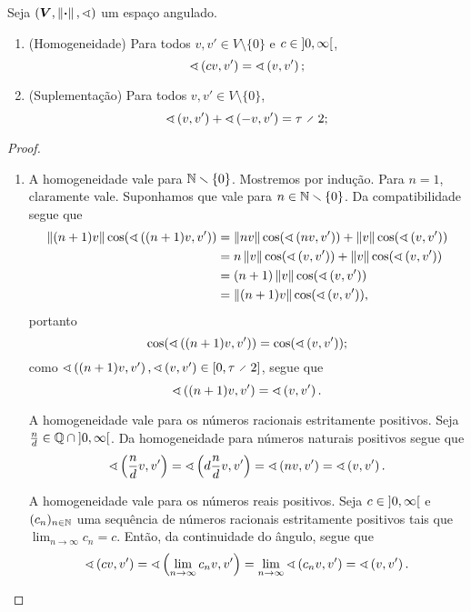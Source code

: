 \begin{proposition}
Seja $(\bm V, \left\Vert{\bm{\cdot}}\right\Vert,\sphericalangle)$ um espaço angulado.
	\begin{enumerate}
		\item (Homogeneidade) Para todos $v,v' \in V \setminus \{0\}$ e $c \in \left]{0},{\infty}\right[$,
			\begin{equation*}
				\sphericalangle\left({cv},{v'}\right) = \sphericalangle\left({v},{v'}\right);
			\end{equation*}
		\item (Suplementação) Para todos $v,v' \in V \setminus \{0\}$,
			\begin{equation*}
				\ang{v}{v'} + \ang{-v}{v'} = \tau \div 2;
			\end{equation*}
	\end{enumerate}
\end{proposition}
\begin{proof}
	\begin{enumerate}
		\item A homogeneidade vale para $\mathbb{N} \smallsetminus \{0\}$. Mostremos por indução. Para $n=1$, claramente vale. Suponhamos que vale para $n \in \mathbb{N} \smallsetminus \{0\}$. Da compatibilidade segue que
			\begin{align*}
				\left\Vert{(n+1)v}\right\Vert\cos(\sphericalangle\left({(n+1)v},{v'}\right)) &= \left\Vert{nv}\right\Vert\cos(\sphericalangle\left({nv},{v'}\right)) + \left\Vert{v}\right\Vert\cos(\sphericalangle\left({v},{v'}\right)) \\	
					&=n\left\Vert{v}\right\Vert\cos(\sphericalangle\left({v},{v'}\right)) + \left\Vert{v}\right\Vert\cos(\sphericalangle\left({v},{v'}\right)) \\
					&= (n+1)\left\Vert{v}\right\Vert\cos(\sphericalangle\left({v},{v'}\right)) \\
					&= \left\Vert{(n+1)v}\right\Vert\cos(\sphericalangle\left({v},{v'}\right)),
			\end{align*}
		portanto
		\begin{equation*}
			\cos(\sphericalangle\left({(n+1)v},{v'}\right)) = \cos(\sphericalangle\left({v},{v'}\right));
		\end{equation*}
		como $\ang{(n+1)v}{v'}, \ang{v}{v'} \in \intff{0}{\tau \div 2}$, segue que
			\begin{equation*}
				\sphericalangle\left({(n+1)v},{v'}\right) = \sphericalangle\left({v},{v'}\right).
			\end{equation*}
		
		A homogeneidade vale para os números racionais estritamente positivos. Seja $\frac{n}{d} \in \mathbb{Q} \cap \left]{0},{\infty}\right[$. Da homogeneidade para números naturais positivos segue que
			\begin{equation*}
				\sphericalangle\left({\frac{n}{d}v},{v'}\right) = \sphericalangle\left({d\frac{n}{d}v},{v'}\right) = \sphericalangle\left({nv},{v'}\right) = \sphericalangle\left({v},{v'}\right).
			\end{equation*}
		
		A homogeneidade vale para os números reais positivos. Seja $c \in \left]{0},{\infty}\right[$ e $(c_n)_{n \in \mathbb{N}}$ uma sequência de números racionais estritamente positivos tais que $\lim_{n \to \infty} c_n = c$. Então, da continuidade do ângulo, segue que
			\begin{equation*}
				\sphericalangle\left({cv},{v'}\right) = \sphericalangle\left({\lim_{n \to \infty} c_n v},{v'}\right) = \lim_{n \to \infty} \sphericalangle\left({c_n v},{v'}\right) = \sphericalangle\left({v},{v'}\right).
			\end{equation*}


\end{enumerate}
\end{proof}
